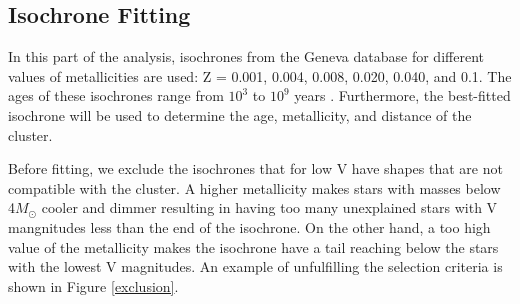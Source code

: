 \documentclass[12pt]{article}
\begin{document}
\subsection{Isochrone Fitting}
In this part of the analysis, isochrones from the Geneva database for different values of metallicities are used: Z = 0.001, 0.004, 0.008, 0.020, 0.040, and 0.1. The ages of these isochrones range from $10^{3}$ to $10^{9}$ years \cite{isochrones}. Furthermore, the best-fitted isochrone will be used to determine the age, metallicity, and distance of the cluster. 

Before fitting, we exclude the isochrones that for low V have shapes that are not compatible with the cluster. A higher metallicity makes stars with masses below 4$M_\odot$ cooler and dimmer resulting in having too many unexplained stars with V mangnitudes less than the end of the isochrone. On the other hand, a too high value of the metallicity makes the isochrone have a tail reaching below the stars with the lowest V magnitudes. An example of unfulfilling the selection criteria is shown in Figure \ref{exclusion}. 
\end{document}
